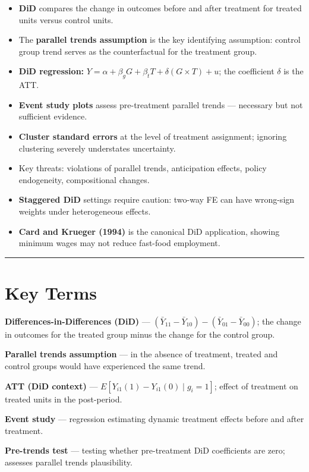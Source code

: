 \begin{itemize}
\item \textbf{DiD} compares the change in outcomes before and after treatment for treated units versus control units.
\item The \textbf{parallel trends assumption} is the key identifying assumption: control group trend serves as the counterfactual for the treatment group.
\item \textbf{DiD regression:} $Y = \alpha + \beta_g G + \beta_t T + \delta(G \times T) + u$; the coefficient $\delta$ is the ATT.
\item \textbf{Event study plots} assess pre-treatment parallel trends --- necessary but not sufficient evidence.
\item \textbf{Cluster standard errors} at the level of treatment assignment; ignoring clustering severely understates uncertainty.
\item Key threats: violations of parallel trends, anticipation effects, policy endogeneity, compositional changes.
\item \textbf{Staggered DiD} settings require caution: two-way FE can have wrong-sign weights under heterogeneous effects.
\item \textbf{Card and Krueger (1994)} is the canonical DiD application, showing minimum wages may not reduce fast-food employment.
\end{itemize}

\medskip\hrule\medskip

\section{Key Terms}

\textbf{Differences-in-Differences (DiD)} --- $(\bar{Y}_{11} - \bar{Y}_{10}) - (\bar{Y}_{01} - \bar{Y}_{00})$; the change in outcomes for the treated group minus the change for the control group.

\textbf{Parallel trends assumption} --- in the absence of treatment, treated and control groups would have experienced the same trend.

\textbf{ATT (DiD context)} --- $E[Y_{i1}(1) - Y_{i1}(0) \mid g_i = 1]$; effect of treatment on treated units in the post-period.

\textbf{Event study} --- regression estimating dynamic treatment effects before and after treatment.

\textbf{Pre-trends test} --- testing whether pre-treatment DiD coefficients are zero; assesses parallel trends plausibility.

